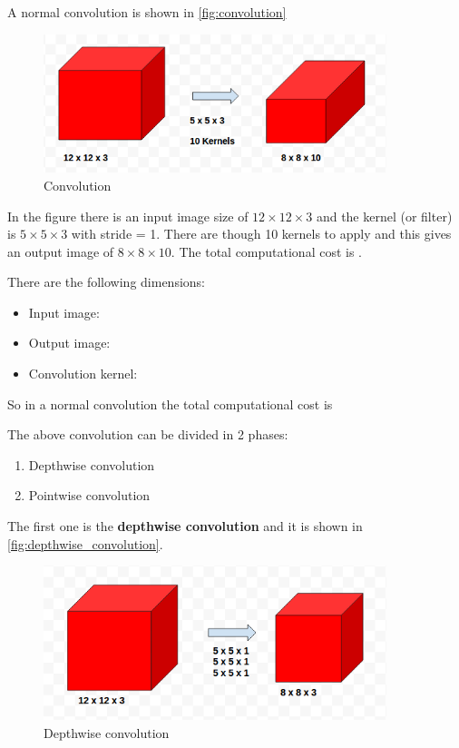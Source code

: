 A normal convolution is shown in \autoref{fig:convolution}

\begin{figure}[ht]
    \includegraphics[width=10cm]{images/experiments/convolution.png}
    \centering
    \caption{Convolution}\label{fig:convolution}
\end{figure}

In the figure there is an input image size of $12\times12\times3$ and the
kernel (or filter) is $5\times5\times3$ with stride = 1. There are though 10
kernels to apply and this gives an output image of $8\times8\times10$.
The total computational cost is .

There are the following dimensions:
\begin{itemize}
    \item Input image: 
    \item Output image: 
    \item Convolution kernel: 
\end{itemize}

So in a normal convolution the total computational cost is

The above convolution can be divided  in 2 phases:
\begin{enumerate}
    \item Depthwise convolution
    \item Pointwise convolution
\end{enumerate}

The first one is the \textbf{depthwise convolution} and it is shown in
\autoref{fig:depthwise_convolution}.

\begin{figure}[ht]
    \includegraphics[width=10cm]{images/experiments/depthwise_convolution.png}
    \centering
    \caption{Depthwise convolution}\label{fig:depthwise_convolution}
\end{figure}

